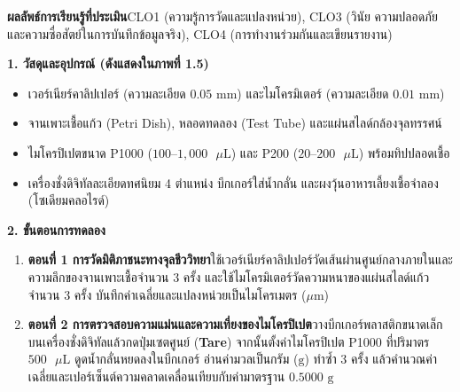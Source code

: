 \begin{labbox}
\noindent\textbf{ผลลัพธ์การเรียนรู้ที่ประเมิน}\quad CLO1 (ความรู้การวัดและแปลงหน่วย), CLO3 (วินัย ความปลอดภัย และความซื่อสัตย์ในการบันทึกข้อมูลจริง), CLO4 (การทำงานร่วมกันและเขียนรายงาน)

\vspace{4pt}
\noindent\textbf{1. วัสดุและอุปกรณ์ (ดังแสดงใน\mbox{ภาพที่} 1.5)}
\begin{itemize}
    \item เวอร์เนียร์คาลิปเปอร์ (ความละเอียด $0.05\text{ mm}$) และไมโครมิเตอร์ (ความละเอียด $0.01\text{ mm}$)
    \item จานเพาะเชื้อแก้ว (Petri Dish), หลอดทดลอง (Test Tube) และแผ่นสไลด์กล้องจุลทรรศน์
    \item ไมโครปิเปตขนาด P1000 ($100\text{--}1{,}000\text{ }\mu\text{L}$) และ P200 ($20\text{--}200\text{ }\mu\text{L}$) พร้อมทิปปลอดเชื้อ
    \item เครื่องชั่งดิจิทัลละเอียดทศนิยม 4 ตำแหน่ง บีกเกอร์ใส่น้ำกลั่น และผงวุ้นอาหารเลี้ยงเชื้อจำลอง (โซเดียมคลอไรด์)
\end{itemize}

\noindent\textbf{2. ขั้นตอนการทดลอง}
\begin{enumerate}
    \item \textbf{ตอนที่ 1 การวัดมิติภาชนะทางจุลชีววิทยา}\quad ใช้เวอร์เนียร์คาลิปเปอร์วัดเส้นผ่านศูนย์กลางภายในและความลึกของจานเพาะเชื้อจำนวน 3 ครั้ง และใช้ไมโครมิเตอร์วัดความหนาของแผ่นสไลด์แก้วจำนวน 3 ครั้ง บันทึกค่าเฉลี่ยและแปลงหน่วยเป็นไมโครเมตร ($\mu\text{m}$)
    \item \textbf{ตอนที่ 2 การตรวจสอบความแม่นและความเที่ยงของไมโครปิเปต}\quad วางบีกเกอร์พลาสติกขนาดเล็กบนเครื่องชั่งดิจิทัลแล้วกดปุ่มเซตศูนย์ (\textbf{Tare}) จากนั้นตั้งค่าไมโครปิเปต P1000 ที่ปริมาตร $500\text{ }\mu\text{L}$ ดูดน้ำกลั่นหยดลงในบีกเกอร์ อ่านค่ามวลเป็นกรัม ($\text{g}$) ทำซ้ำ 3 ครั้ง แล้วคำนวณค่าเฉลี่ยและเปอร์เซ็นต์ความคลาดเคลื่อนเทียบกับค่ามาตรฐาน $0.5000\text{ g}$
\end{enumerate}


\end{labbox}
